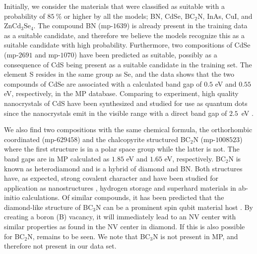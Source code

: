 \documentclass[superscriptaddress,unsortedaddress,
 amsmath,amssymb,
 aps,
]{revtex4-2}
\begin{document}
Initially, we consider the materials that were classified as suitable with a probability of $85 \ \%$ or higher by all the models; BN, CdSe, BC$_2$N, InAs, CuI, and ZnCd$_3$Se$_4$. 
The compound BN (mp-$1639$) is already present in the training data as a suitable candidate, and therefore we believe the models recognize this as a suitable candidate with high probability. Furthermore, two compositions of CdSe (mp-$2691$ and mp-$1070$) have been predicted as suitable, possibly as a consequence of CdS being present as a suitable candidate in the training set. The element S resides in the same group as Se, and the data shows that the two compounds of CdSe are associated with a calculated band gap of $0.5$ eV and $0.55$ eV, respectively, in the MP database. 
Comparing to experiment, high quality nanocrystals of CdS have been synthesized and studied for use as quantum dots since the nanocrystals emit in the visible range with a direct band gap of $2.5$~eV \cite{CelebiSerdar2007SaCo, BanerjeeR2000Eots}. %

We also find two compositions with the same chemical formula, the orthorhombic coordinated (mp-$629458$) and the chalcopyrite structured BC$_2$N (mp-$1008523$) where the first structure is in a polar space group while the latter is not. The band gaps are in MP calculated as $1.85$ eV and $1.65$ eV, respectively. BC$_2$N is known as heterodiamond and is a hybrid of diamond and BN. Both structures have, as expected, strong covalent character and have been studied for application as nanostructures \cite{Gao2017}, hydrogen storage \cite{Cai2017} and superhard materials \cite{Li2017, Jiang2020} in ab-initio calculations. Of similar compounds, it has been predicted that the diamond-like structure of BC$_3$N can be a prominent spin qubit material host \cite{Wang2020SpinQB}. By creating a boron (B) vacancy, it will immediately lead to an NV center with similar properties as found in the NV center in diamond. If this is also possible for BC$_2$N, remains to be seen. We note that BC$_3$N is not present in MP, and therefore not present in our data set.
\end{document}
